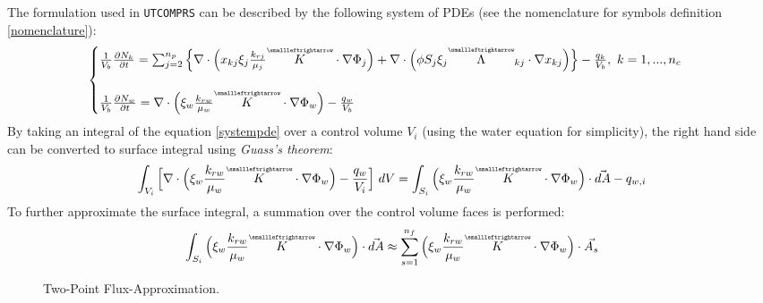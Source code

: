 The formulation used in \texttt{UTCOMPRS} can be described by the following system of PDEs\supercite{phdfernandes} (see the nomenclature for symbols definition \ref{nomenclature}):
\begingroup\makeatletter\def\f@size{12}\check@mathfonts
\begin{equation}
	\begin{cases}
		\frac{1}{V_{b}} \frac{\partial N_{k}}{\partial t} = \sum_{j=2}^{n_{p}}\Big\{\nabla \cdot\Big( x_{kj}\xi_{j}\frac{k_{rj}}{\mu_{j}}\tensor{K}\cdot\nabla\Phi_{j}\Big) + \nabla \cdot \Big(\phi S_{j}\xi_{j}\tensor{\Lambda}_{kj}\cdot\nabla x_{kj}\Big)\Big\} - \frac{q_{k}}{V_{b}}, \ k=1,...,n_{c}\\\\
		\frac{1}{V_{b}} \frac{\partial N_{w}}{\partial t} = \nabla \cdot \Big(\xi_{w}\frac{k_{rw}}{\mu_{w}}\tensor{K}\cdot \nabla\Phi_{w}\Big) - \frac{q_{w}}{V_{b}}
	\end{cases}
\label{systempde}
\end{equation}\endgroup
By taking an integral of the equation \ref{systempde} over a control volume $V_{i}$ (using the water equation for simplicity), the right hand side can be converted to surface integral using \textit{Guass's theorem}:
\begin{equation}
\int_{V_{i}}\Big[\nabla \cdot \Big(\xi_{w}\frac{k_{rw}}{\mu_{w}}\tensor{K}\cdot \nabla\Phi_{w}\Big) - \frac{q_{w}}{V_{i}}\Big] \ dV = \int_{S_{i}}\Big(\xi_{w}\frac{k_{rw}}{\mu_{w}}\tensor{K}\cdot \nabla\Phi_{w}\Big)\cdot \vec{dA} - q_{w,i}
\end{equation}
To further approximate the surface integral, a summation over the control volume faces is performed:
\begin{equation}
\int_{S_{i}}\Big(\xi_{w}\frac{k_{rw}}{\mu_{w}}\tensor{K}\cdot \nabla\Phi_{w}\Big)\cdot \vec{dA} \approx \sum_{s=1}^{n_{f}} \Big(\xi_{w}\frac{k_{rw}}{\mu_{w}}\tensor{K}\cdot \nabla\Phi_{w}\Big)\cdot\vec{A_{s}}
\label{surface}
\end{equation}

\begin{figure}[htb]
\raggedright
\resizebox{13cm}{!}{}
\caption{Two-Point Flux-Approximation.}\label{tpfa-tikz}
\end{figure}


